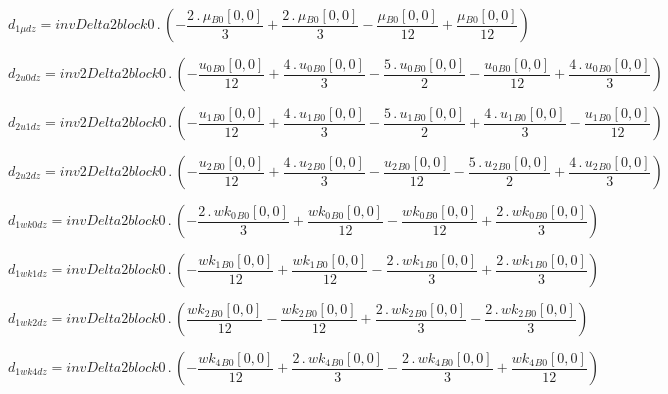 \documentclass{article}
\begin{document}
\begin{dmath}d_{1 \mu dz} = invDelta2block0 \,.\, \left(- \frac{2 \,.\, {\mu{_{B0}}}[{0,0}]}{3} + \frac{2 \,.\, {\mu{_{B0}}}[{0,0}]}{3} - \frac{{\mu{_{B0}}}[{0,0}]}{12} + \frac{{\mu{_{B0}}}[{0,0}]}{12}\right)\end{dmath}

\begin{dmath}d_{2 u0 dz} = inv2Delta2block0 \,.\, \left(- \frac{{u_{0}{_{B0}}}[{0,0}]}{12} + \frac{4 \,.\, {u_{0}{_{B0}}}[{0,0}]}{3} - \frac{5 \,.\, {u_{0}{_{B0}}}[{0,0}]}{2} - \frac{{u_{0}{_{B0}}}[{0,0}]}{12} + \frac{4 \,.\, 
{u_{0}{_{B0}}}[{0,0}]}{3}\right)\end{dmath}

\begin{dmath}d_{2 u1 dz} = inv2Delta2block0 \,.\, \left(- \frac{{u_{1}{_{B0}}}[{0,0}]}{12} + \frac{4 \,.\, {u_{1}{_{B0}}}[{0,0}]}{3} - \frac{5 \,.\, {u_{1}{_{B0}}}[{0,0}]}{2} + \frac{4 \,.\, {u_{1}{_{B0}}}[{0,0}]}{3} - 
\frac{{u_{1}{_{B0}}}[{0,0}]}{12}\right)\end{dmath}

\begin{dmath}d_{2 u2 dz} = inv2Delta2block0 \,.\, \left(- \frac{{u_{2}{_{B0}}}[{0,0}]}{12} + \frac{4 \,.\, {u_{2}{_{B0}}}[{0,0}]}{3} - \frac{{u_{2}{_{B0}}}[{0,0}]}{12} - \frac{5 \,.\, {u_{2}{_{B0}}}[{0,0}]}{2} + \frac{4 \,.\, 
{u_{2}{_{B0}}}[{0,0}]}{3}\right)\end{dmath}

\begin{dmath}d_{1 wk0 dz} = invDelta2block0 \,.\, \left(- \frac{2 \,.\, {wk_{0}{_{B0}}}[{0,0}]}{3} + \frac{{wk_{0}{_{B0}}}[{0,0}]}{12} - \frac{{wk_{0}{_{B0}}}[{0,0}]}{12} + \frac{2 \,.\, {wk_{0}{_{B0}}}[{0,0}]}{3}\right)\end{dmath}

\begin{dmath}d_{1 wk1 dz} = invDelta2block0 \,.\, \left(- \frac{{wk_{1}{_{B0}}}[{0,0}]}{12} + \frac{{wk_{1}{_{B0}}}[{0,0}]}{12} - \frac{2 \,.\, {wk_{1}{_{B0}}}[{0,0}]}{3} + \frac{2 \,.\, {wk_{1}{_{B0}}}[{0,0}]}{3}\right)\end{dmath}

\begin{dmath}d_{1 wk2 dz} = invDelta2block0 \,.\, \left(\frac{{wk_{2}{_{B0}}}[{0,0}]}{12} - \frac{{wk_{2}{_{B0}}}[{0,0}]}{12} + \frac{2 \,.\, {wk_{2}{_{B0}}}[{0,0}]}{3} - \frac{2 \,.\, {wk_{2}{_{B0}}}[{0,0}]}{3}\right)\end{dmath}

\begin{dmath}d_{1 wk4 dz} = invDelta2block0 \,.\, \left(- \frac{{wk_{4}{_{B0}}}[{0,0}]}{12} + \frac{2 \,.\, {wk_{4}{_{B0}}}[{0,0}]}{3} - \frac{2 \,.\, {wk_{4}{_{B0}}}[{0,0}]}{3} + \frac{{wk_{4}{_{B0}}}[{0,0}]}{12}\right)\end{dmath}
\end{document}
